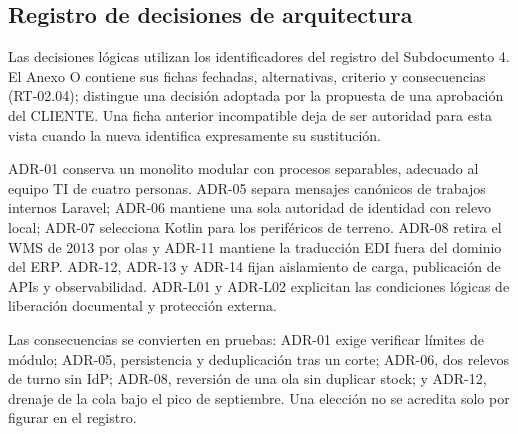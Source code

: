 \subsection{Registro de decisiones de arquitectura}
\label{sec:adr}

Las decisiones lógicas utilizan los identificadores del registro del Subdocumento 4. El Anexo O contiene sus fichas fechadas, alternativas, criterio y consecuencias (RT-02.04); distingue una decisión adoptada por la propuesta de una aprobación del CLIENTE. Una ficha anterior incompatible deja de ser autoridad para esta vista cuando la nueva identifica expresamente su sustitución.

ADR-01 conserva un monolito modular con procesos separables, adecuado al equipo TI de cuatro personas. ADR-05 separa mensajes canónicos de trabajos internos Laravel; ADR-06 mantiene una sola autoridad de identidad con relevo local; ADR-07 selecciona Kotlin para los periféricos de terreno. ADR-08 retira el WMS de 2013 por olas y ADR-11 mantiene la traducción EDI fuera del dominio del ERP. ADR-12, ADR-13 y ADR-14 fijan aislamiento de carga, publicación de APIs y observabilidad. ADR-L01 y ADR-L02 explicitan las condiciones lógicas de liberación documental y protección externa.

Las consecuencias se convierten en pruebas: ADR-01 exige verificar límites de módulo; ADR-05, persistencia y deduplicación tras un corte; ADR-06, dos relevos de turno sin IdP; ADR-08, reversión de una ola sin duplicar stock; y ADR-12, drenaje de la cola bajo el pico de septiembre. Una elección no se acredita solo por figurar en el registro.

